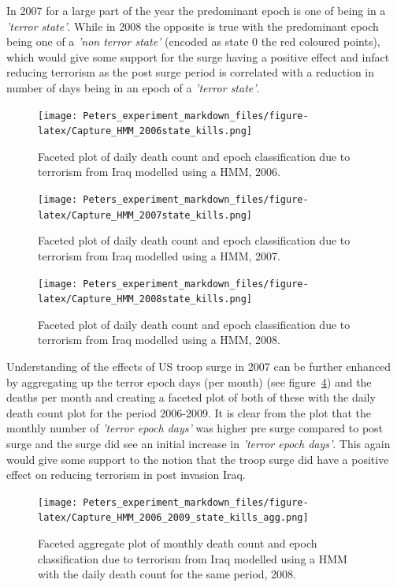 In 2007 for a large part of the year the predominant epoch is one of being in a \textit{'terror state'}. While in 2008 the opposite is true with the predominant epoch being one of a \textit{'non terror state'} (encoded as state 0 the red coloured points), which would give some support for the  surge having a positive effect and infact reducing terrorism as the post surge period is correlated with a reduction in number of days being in an epoch of a \textit{'terror state'}.

\begin{figure}[t]
\texttt{[image: Peters\_experiment\_markdown\_files/figure-latex/Capture\_HMM\_2006state\_kills.png]}
\caption{Faceted plot of daily death count and epoch classification due to terrorism from Iraq modelled using a HMM, 2006.}
\label{fig:Rplot02_2006_facstate_HMM}
\centering
\end{figure}


\begin{figure}[t]
\texttt{[image: Peters\_experiment\_markdown\_files/figure-latex/Capture\_HMM\_2007state\_kills.png]}
\caption{Faceted plot of daily death count and epoch classification due to terrorism from Iraq modelled using a HMM, 2007.}
\label{fig:Rplot02_2007_facstate_HMM}
\centering
\end{figure}

\begin{figure}[t]
\texttt{[image: Peters\_experiment\_markdown\_files/figure-latex/Capture\_HMM\_2008state\_kills.png]}
\caption{Faceted plot of daily death count and epoch classification due to terrorism from Iraq modelled using a HMM, 2008.}
\label{fig:Rplot02_2008_facstate_HMM}
\centering
\end{figure}

Understanding of the effects of US troop surge in 2007 can be further enhanced by aggregating up the terror epoch days (per month) (see figure~\ref{fig:Rplot02_2008_facstate_HMM_agg}) and the deaths per month and creating a faceted plot of both of these with the daily death count plot for the period 2006-2009. It is clear from the plot that the monthly number of \textit{'terror epoch days'} was higher pre surge compared to post surge and the surge did see an initial increase in \textit{'terror epoch days'}. This again would give some support to the notion that the troop surge did have a positive effect on reducing terrorism in post invasion Iraq.

\begin{figure}[t]
\texttt{[image: Peters\_experiment\_markdown\_files/figure-latex/Capture\_HMM\_2006\_2009\_state\_kills\_agg.png]}
\caption{Faceted aggregate plot of monthly death count and epoch classification due to terrorism from Iraq modelled using a HMM with the daily death count for the same period, 2008.}
\label{fig:Rplot02_2008_facstate_HMM_agg}
\centering
\end{figure}


